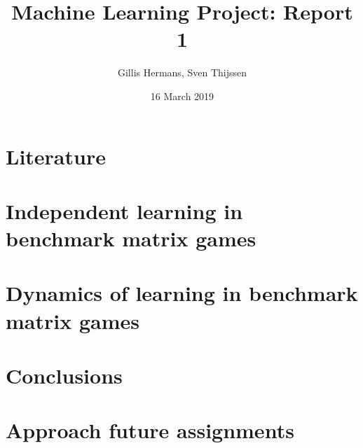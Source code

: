 \documentclass[10pt,a4paper]{article}
\author{Gillis Hermans, Sven Thijssen}
\title{Machine Learning Project: Report 1}
\date{16 March 2019}
\begin{document}
\maketitle
\section{Literature}
\section{Independent learning in benchmark matrix games}
\section{Dynamics of learning in benchmark matrix games}
\section{Conclusions}
\section{Approach future assignments}
\end{document}
